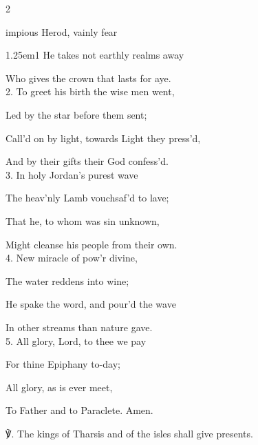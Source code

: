 \label{Epiphany}


\begin{paracol}{2}
\sloppy

\firstEvensong


\firstEvensongHymn\label{EpiphanyEvensongHymn}

 impious Herod, vainly fear

\begin{hangparas}{1.25em}{1}
He takes not earthly realms away

Who gives the crown that lasts for aye.\\

2. To greet his birth the wise men went,

Led by the star before them sent;

Call'd on by light, towards Light they press'd,

And by their gifts their God confess'd.\\

3. In holy Jordan's purest wave

The heav'nly Lamb vouchsaf'd to lave;

That he, to whom was sin unknown,

Might cleanse his people from their own.\\

4. New miracle of pow'r divine,

The water reddens into wine;

He spake the word, and pour'd the wave

In other streams than nature gave.\\

5. All glory, Lord, to thee we pay

For thine Epiphany to-day;

All glory, as is ever meet,

To Father and to Paraclete. Amen.\\
\end{hangparas}

℣. The kings of Tharsis and of the isles shall give presents.


\end{paracol}
